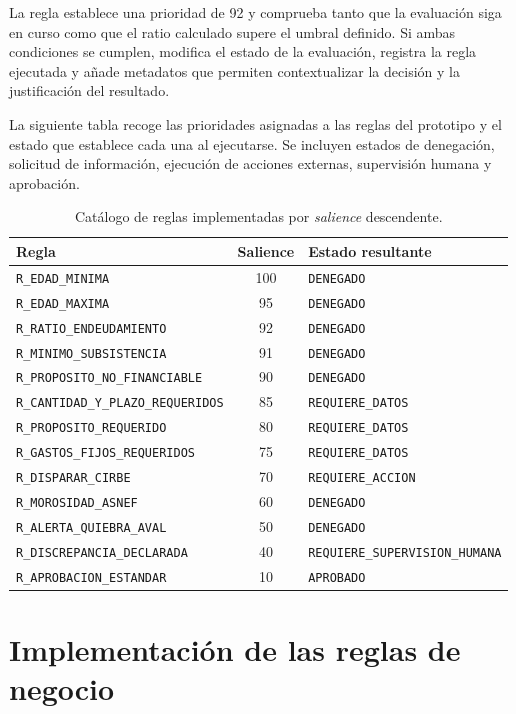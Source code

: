 \documentclass[12pt,a4paper]{report}
\begin{document}
La regla establece una prioridad de 92 y comprueba tanto que la evaluación siga en curso como que el ratio calculado supere el umbral definido. Si ambas condiciones se cumplen, modifica el estado de la evaluación, registra la regla ejecutada y añade metadatos que permiten contextualizar la decisión y la justificación del resultado.

La siguiente tabla recoge las prioridades asignadas a las reglas del prototipo y el estado que establece cada una al ejecutarse. Se incluyen estados de denegación, solicitud de información, ejecución de acciones externas, supervisión humana y aprobación.

\begin{table}[H]
\centering
\small
\begin{tabular}{|l|c|l|}
\hline
\textbf{Regla} & \textbf{Salience} & \textbf{Estado resultante} \\
\hline
\texttt{R\_EDAD\_MINIMA} & 100 & \texttt{DENEGADO} \\
\texttt{R\_EDAD\_MAXIMA} & 95 & \texttt{DENEGADO} \\
\texttt{R\_RATIO\_ENDEUDAMIENTO} & 92 & \texttt{DENEGADO} \\
\texttt{R\_MINIMO\_SUBSISTENCIA} & 91 & \texttt{DENEGADO} \\
\texttt{R\_PROPOSITO\_NO\_FINANCIABLE} & 90 & \texttt{DENEGADO} \\
\texttt{R\_CANTIDAD\_Y\_PLAZO\_REQUERIDOS} & 85 & \texttt{REQUIERE\_DATOS} \\
\texttt{R\_PROPOSITO\_REQUERIDO} & 80 & \texttt{REQUIERE\_DATOS} \\
\texttt{R\_GASTOS\_FIJOS\_REQUERIDOS} & 75 & \texttt{REQUIERE\_DATOS} \\
\texttt{R\_DISPARAR\_CIRBE} & 70 & \texttt{REQUIERE\_ACCION} \\
\texttt{R\_MOROSIDAD\_ASNEF} & 60 & \texttt{DENEGADO} \\
\texttt{R\_ALERTA\_QUIEBRA\_AVAL} & 50 & \texttt{DENEGADO} \\
\texttt{R\_DISCREPANCIA\_DECLARADA} & 40 & \texttt{REQUIERE\_SUPERVISION\_HUMANA} \\
\texttt{R\_APROBACION\_ESTANDAR} & 10 & \texttt{APROBADO} \\
\hline
\end{tabular}
\caption{Catálogo de reglas implementadas por \textit{salience} descendente.}
\end{table}

\section{Implementación de las reglas de negocio}
\end{document}
